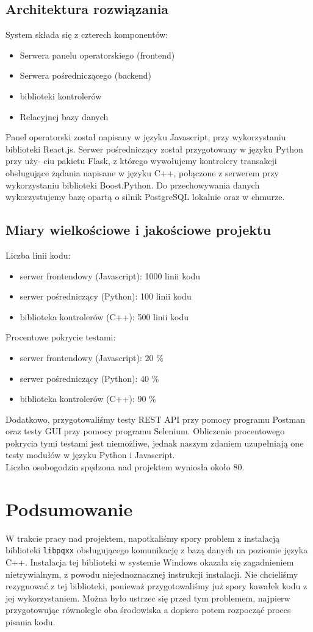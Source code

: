 \documentclass{article}
\begin{document}
\subsection{Architektura rozwiązania}
System składa się z czterech komponentów:
\begin{itemize}
\item Serwera panelu operatorskiego (frontend)
\item Serwera pośredniczącego (backend)
\item biblioteki kontrolerów 
\item Relacyjnej bazy danych
\end{itemize}
Panel operatorski został napisany w języku Javascript, przy wykorzystaniu
biblioteki React.js. Serwer pośredniczący został przygotowany w języku Python przy uży-
ciu pakietu Flask, z którego wywołujemy kontrolery transakcji obsługujące żądania
napisane w języku C++, połączone z serwerem przy wykorzystaniu biblioteki
Boost.Python. Do przechowywania danych wykorzystujemy bazę opartą o silnik PostgreSQL
lokalnie oraz w chmurze.

\subsection{Miary wielkościowe i jakościowe projektu}
Liczba linii kodu:
\begin{itemize}
    \item serwer frontendowy (Javascript): 1000 linii kodu
    \item serwer pośredniczący (Python): 100 linii kodu
    \item biblioteka kontrolerów (C++): 500 linii kodu
\end{itemize}

Procentowe pokrycie testami:
\begin{itemize}
    \item serwer frontendowy (Javascript): $20$ \%
    \item serwer pośredniczący (Python): $40$ \%
    \item biblioteka kontrolerów (C++): $90$ \%
\end{itemize}
Dodatkowo, przygotowaliśmy testy REST API przy pomocy programu Postman oraz testy
GUI przy pomocy programu Selenium. Obliczenie procentowego pokrycia tymi testami 
jest niemożliwe, jednak naszym zdaniem uzupełniają one testy modułów w języku Python
i Javascript.\\

Liczba osobogodzin spędzona nad projektem wyniosła około 80.
\section{Podsumowanie}
W trakcie pracy nad projektem, napotkaliśmy spory problem z instalacją biblioteki \texttt{libpqxx}
obsługującego komunikację z bazą danych na poziomie języka C++. Instalacja tej biblioteki w systemie Windows
okazała się zagadnieniem nietrywialnym, z powodu niejednoznacznej instrukcji instalacji. Nie chcieliśmy 
rezygnować z tej biblioteki, ponieważ przygotowaliśmy już spory kawałek kodu z jej wykorzystaniem. Można było ustrzec się
przed tym problemem, najpierw przygotowując równolegle oba środowiska a dopiero potem rozpocząć
proces pisania kodu. 
\end{document}
